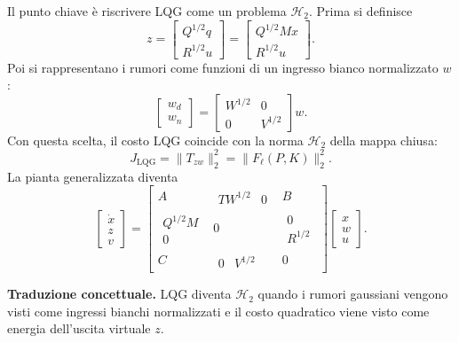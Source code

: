 \documentclass[11pt,a4paper]{article}
\begin{document}
Il punto chiave \`e riscrivere LQG come un problema $\mathcal{H}_2$. Prima si definisce
$$
z=
\begin{bmatrix}
Q^{1/2}q\\
R^{1/2}u
\end{bmatrix}
=
\begin{bmatrix}
Q^{1/2}Mx\\
R^{1/2}u
\end{bmatrix}.
$$
Poi si rappresentano i rumori come funzioni di un ingresso bianco normalizzato $w$:
$$
\begin{bmatrix}
w_d\\
w_n
\end{bmatrix}
=
\begin{bmatrix}
W^{1/2} & 0\\
0 & V^{1/2}
\end{bmatrix}w.
$$
Con questa scelta, il costo LQG coincide con la norma $\mathcal{H}_2$ della mappa chiusa:
$$
J_{\mathrm{LQG}}
=
\|T_{zw}\|_2^2
=
\|F_\ell(P,K)\|_2^2.
$$
La pianta generalizzata diventa
$$
\left[
\begin{array}{c}
\dot{x}\\
z\\
v
\end{array}
\right]
=
\left[
\begin{array}{c|cc}
A & \begin{array}{cc}TW^{1/2} & 0\end{array} & B\\
\hline
\begin{array}{c}Q^{1/2}M\\0\end{array}
& 0
& \begin{array}{c}0\\R^{1/2}\end{array}\\
C & \begin{array}{cc}0 & V^{1/2}\end{array} & 0
\end{array}
\right]
\left[
\begin{array}{c}
x\\
w\\
u
\end{array}
\right].
$$

\begin{focusbox}
\textbf{Traduzione concettuale.} LQG diventa $\mathcal{H}_2$ quando i rumori gaussiani vengono visti come ingressi bianchi normalizzati e il costo quadratico viene visto come energia dell'uscita virtuale $z$.
\end{focusbox}
\end{document}
